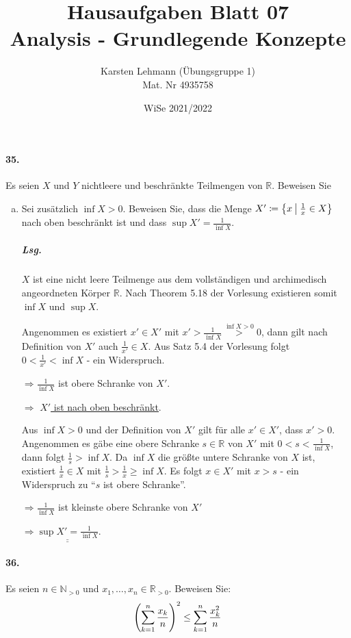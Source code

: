\documentclass{scrreprt}
\author{Karsten Lehmann (Übungsgruppe 1)\\Mat. Nr 4935758}
\date{WiSe 2021/2022}
\title{Hausaufgaben Blatt 07\\Analysis - Grundlegende Konzepte}
\begin{document}
\paragraph{35.} Es seien $X$ und $Y$ nichtleere und beschränkte Teilmengen von
$\mathbb{R}$.
Beweisen Sie
\begin{enumerate}[(a)]
\item Sei zusätzlich $\inf X > 0$.
  Beweisen Sie, dass die Menge
  $X' \coloneqq \qty\big{x \: {\big |} \: \frac{1}{x} \in X}$
  nach oben beschränkt ist und dass
  $\sup X' = \frac{1}{\inf X}$.

  \subparagraph{Lsg.} $X$ ist eine nicht leere Teilmenge aus dem vollständigen
  und archimedisch angeordneten Körper $\mathbb{R}$.
  Nach Theorem 5.18 der Vorlesung existieren somit $\inf X$ und $\sup X$.

  Angenommen es existiert $x' \in X'$ mit
  $x' > \frac{1}{\inf X} \overset{\inf X > 0}> 0$, dann gilt nach Definition
  von $X'$ auch $\frac{1}{x'} \in X$.
  Aus Satz 5.4 der Vorlesung folgt $0 < \frac{1}{x'} < \inf X$ - ein Widerspruch.

  $\Rightarrow \frac{1}{\inf X}$ ist obere Schranke von $X'$.

  $\Rightarrow$ \underline{\underline{$X'$ ist nach oben beschränkt}}.

  Aus $\inf X > 0$ und der Definition von $X'$ gilt für alle
  $x' \in X'$, dass $x' > 0$.
  Angenommen es gäbe eine obere Schranke $s \in \mathbb{R}$ von $X'$ mit
  $0 < s < \frac{1}{\inf X}$, dann folgt $\frac{1}{s} > \inf X$.
  Da $\inf X$ die größte untere Schranke von $X$ ist, existiert
  $\frac{1}{x} \in X$ mit $\frac{1}{s} > \frac{1}{x} \geq \inf X$.
  Es folgt $x \in X'$ mit $x > s$ - ein Widerspruch zu
  ``$s$ ist obere Schranke''.

  $\Rightarrow \frac{1}{\inf X}$ ist kleinste obere Schranke von $X'$

  $\Rightarrow \underline{\underline{\sup X' = \frac{1}{\inf X}}}$.
\end{enumerate}

\newpage
\paragraph{36.} Es seien $n \in \mathbb{N}_{> 0}$ und
$x_1, \ldots, x_n \in \mathbb{R}_{> 0}$.
Beweisen Sie:
\[
  \qty(\sum_{k = 1}^n \frac{x_k}{n})^2 \leq \sum_{k = 1}^n \frac{x_k^2}{n}
\]
\end{document}

